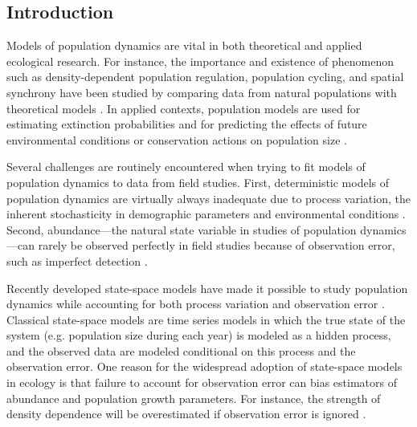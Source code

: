 \documentclass[12pt,english]{article}
\begin{document}
\begin{spacing}{1.9}
\begin{flushleft}

\section*{Introduction}
Models of population dynamics are vital in both theoretical and
applied ecological research. For instance, 
the importance and existence of phenomenon such as
density-dependent population regulation, population cycling, and
spatial synchrony have been studied by comparing data from natural
populations with theoretical models
\citep{may:1975,turchin:1990,bjornstad_etal:1999}. 
In applied contexts, population models are used for estimating extinction probabilities
\citep{schoener_spiller:1992,nadeem_lele:2011,hostetler_etal:2012} and for predicting the
effects of future environmental conditions or conservation actions on
population size \citep{jamieson_brooks:2004,hatfield_etal:2012}.

Several challenges are routinely encountered when trying to fit models
of population dynamics to data from field studies. 
First, deterministic models of population dynamics are virtually always inadequate due to process
variation, the inherent stochasticity in demographic parameters and environmental
conditions \citep{bjornstad_grenfell:2001,saether_engen:2002}.
Second, abundance---the natural state variable in studies
of population dynamics---can rarely be observed perfectly in field
studies because of observation error, such as imperfect
detection \citep{link_nichols:1994,kery_etal:2009}.

Recently developed state-space models 
have made it possible to
study population dynamics while accounting for both process variation
and observation error \citep{devalpine_hastings:2002,
  buckland_etal:2004, dennis_etal:2006}. Classical state-space
models are time series models in which the true state of the
system (e.g. population size during each year) is modeled as a hidden
process, and the observed data are modeled conditional on this process
and the observation error. One reason for the widespread adoption of
state-space models in ecology is that failure to account for 
observation error can bias estimators of abundance and
population growth parameters. For instance, the strength of
density dependence will be overestimated if observation error is
ignored \citep{link_nichols:1994,shenk_etal:1998}.


\end{flushleft}
\end{spacing}
\end{document}
